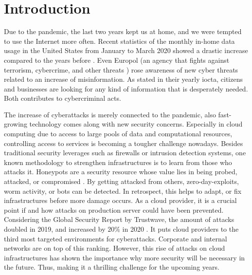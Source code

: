 \chapter{Introduction}


Due to the pandemic, the last two years kept us at home, and we were tempted to use the Internet more often.
Recent statistics of the monthly in-home data usage in the United States from January to March 2020 showed a drastic increase compared to the years before \cite{statista2021}.
Even Europol (an agency that fights against terrorism, cybercrime, and other threats \cite{europol2021}) rose awareness of new cyber threats related to an increase of misinformation.
As stated in their yearly \ac{iocta}, citizens and businesses are looking for any kind of information that is desperately needed.
Both contributes to cybercriminal acts. \cite{iocta2020}

The increase of cyberattacks is merely connected to the pandemic, also fast-growing technology comes along with new security concerns.
Especially in cloud computing due to access to large pools of data and computational resources, controlling access to services is becoming a tougher challenge nowadays.
Besides traditional security leverages such as firewalls or intrusion detection systems, one known methodology to strengthen infrastructures is to learn from those who attacks it.
Honeypots are a security resource whose value lies in being probed, attacked, or compromised \cite{Spitzner2003}.
By getting attacked from others, zero-day-exploits, worm activity, or bots can be detected.
In retrospect, this helps to adapt, or fix infrastructures before more damage occurs.
As a cloud provider, it is a crucial point if and how attacks on production server could have been prevented.
Considering the Global Security Report by Trustwave, the amount of attacks doubled in 2019, and increased by $20\%$ in 2020 \cite{fahim2020}.
It puts cloud providers to the third most targeted environments for cyberattacks.
Corporate and internal networks are on top of this ranking.
However, this rise of attacks on cloud infrastructures has shown the importance why more security will be necessary in the future.
Thus, making it a thrilling challenge for the upcoming years.


